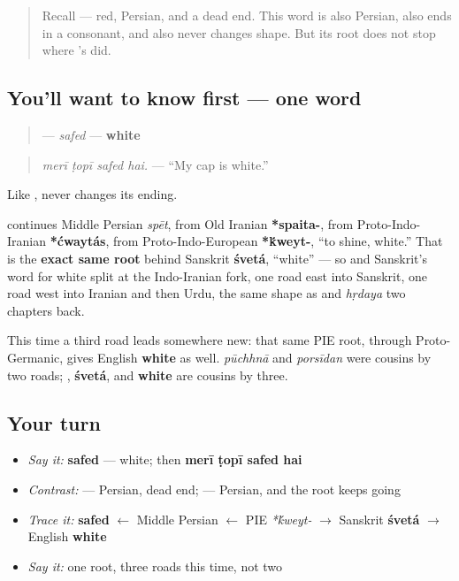 \label{lesson:UR-C13-safed}



\begin{quote}
Recall \textbf{} — red, Persian, and a dead end. This word is also Persian, also ends in a consonant, and also never changes shape. But its root does not stop where \textbf{}'s did.
\end{quote}

\subsection*{You'll want to know first — one word}
\begin{quote}
\textbf{} — \emph{safed} — \textbf{white}
\end{quote}

\begin{quote}
\emph{merī ṭopī safed hai.} — \textquotedblleft{}My cap is white.\textquotedblright{}
\end{quote}

Like \textbf{}, \textbf{} never changes its ending.

\begin{cousinweb}
\textbf{} continues Middle Persian \emph{spēt}, from Old Iranian \textbf{*spaita-}, from Proto-Indo-Iranian \textbf{*ćwaytás}, from Proto-Indo-European \textbf{*\'{k}weyt-}, \textquotedblleft{}to shine, white.\textquotedblright{} That is the \textbf{exact same root} behind Sanskrit \textbf{śvetá}, \textquotedblleft{}white\textquotedblright{} — so \textbf{} and Sanskrit's word for white split at the Indo-Iranian fork, one road east into Sanskrit, one road west into Iranian and then Urdu, the same shape as \textbf{} and \emph{hṛdaya} two chapters back.

This time a third road leads somewhere new: that same PIE root, through Proto-Germanic, gives English \textbf{white} as well. \emph{pūchhnā} and \emph{porsīdan} were cousins by two roads; \textbf{}, \textbf{śvetá}, and \textbf{white} are cousins by three.
\end{cousinweb}

\subsection*{Your turn}
\begin{itemize}
\raggedright
  \item \emph{Say it:} \textbf{safed} — white; then \textbf{merī ṭopī safed hai}
  \item \emph{Contrast:} \textbf{} — Persian, dead end; \textbf{} — Persian, and the root keeps going
  \item \emph{Trace it:} \textbf{safed} $\leftarrow$ Middle Persian $\leftarrow$ PIE \emph{*\'{k}weyt-} $\to$ Sanskrit \textbf{śvetá} $\to$ English \textbf{white}
  \item \emph{Say it:} one root, three roads this time, not two
\end{itemize}

